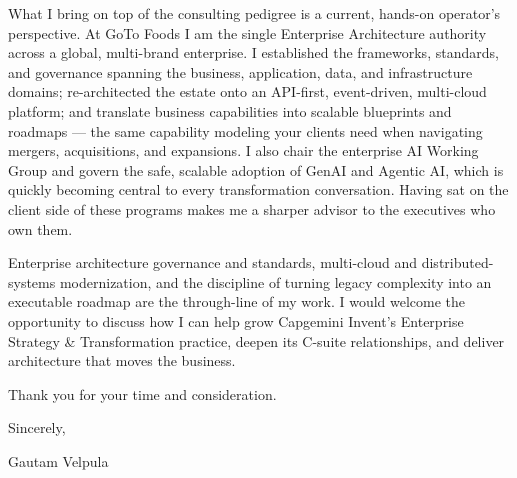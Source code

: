 \documentclass[11pt]{article}
\begin{document}
What I bring on top of the consulting pedigree is a current, hands-on operator's perspective. At GoTo Foods I am the single Enterprise Architecture authority across a global, multi-brand enterprise. I established the frameworks, standards, and governance spanning the business, application, data, and infrastructure domains; re-architected the estate onto an API-first, event-driven, multi-cloud platform; and translate business capabilities into scalable blueprints and roadmaps --- the same capability modeling your clients need when navigating mergers, acquisitions, and expansions. I also chair the enterprise AI Working Group and govern the safe, scalable adoption of GenAI and Agentic AI, which is quickly becoming central to every transformation conversation. Having sat on the client side of these programs makes me a sharper advisor to the executives who own them.

Enterprise architecture governance and standards, multi-cloud and distributed-systems modernization, and the discipline of turning legacy complexity into an executable roadmap are the through-line of my work. I would welcome the opportunity to discuss how I can help grow Capgemini Invent's Enterprise Strategy \& Transformation practice, deepen its C-suite relationships, and deliver architecture that moves the business.

Thank you for your time and consideration.

\vspace{6pt}

Sincerely,

\vspace{6pt}

Gautam Velpula
\end{document}

